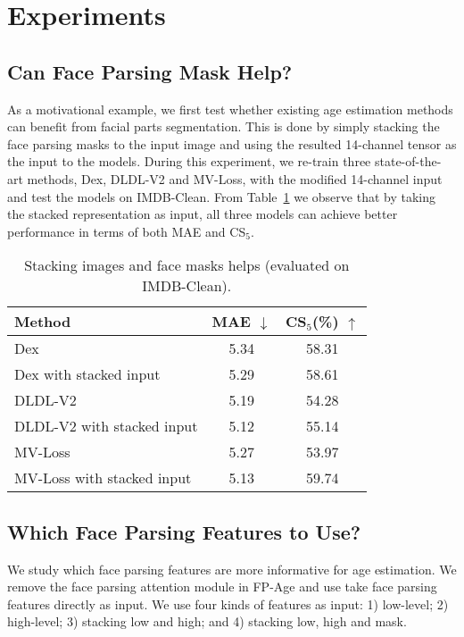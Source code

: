 \section{Experiments}
\subsection{Can Face Parsing Mask Help?}\label{sec:exp:masks}
As a motivational example, we first test whether existing age estimation methods can benefit from facial parts segmentation. This is done by simply stacking the face parsing masks to the input image and using the resulted 14-channel tensor as the input to the models. During this experiment, we re-train three state-of-the-art methods, Dex, DLDL-V2 and MV-Loss, with the modified 14-channel input and test the models on IMDB-Clean. 
From Table~\ref{tab:stack-helps} we observe that by taking the stacked representation as input, all three models can achieve better performance in terms of both MAE and CS$_5$.
\begin{table}[h]
\renewcommand{\arraystretch}{1.3}
    \caption{Stacking images and face masks helps (evaluated on IMDB-Clean).}
    \label{tab:stack-helps}
    \centering
    \begin{tabular}{l|c|c}
    \toprule
        Method & MAE $\downarrow$ & CS$_5$(\%) $\uparrow$\\ \hline
        Dex~\cite{rotheDEXDeepEXpectation2015} &5.34 & 58.31 \\ 
        Dex with stacked input &  5.29 & 58.61\\\hline
        DLDL-V2~\cite{gaoAgeEstimationUsing2018} & 5.19  & 54.28 \\
        DLDL-V2 with stacked input & 5.12 & 55.14 \\\hline
        MV-Loss~\cite{panMeanVarianceLossDeep2018} & 5.27 & 53.97 \\
        MV-Loss with stacked input & 5.13 & 59.74 \\
    \bottomrule
    \end{tabular}
\end{table}

\subsection{Which Face Parsing Features to Use?}
We study which face parsing features are more informative for age estimation. 
We remove the face parsing attention module in FP-Age and use take face parsing features directly as input. 
We use four kinds of features as input: 1) low-level; 2) high-level; 3) stacking low and high; and 4) stacking low, high and mask.

